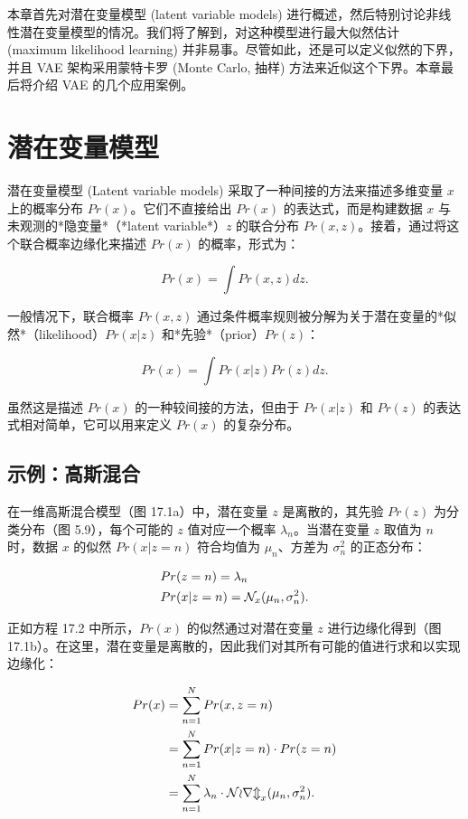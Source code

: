 \documentclass[lang=cn,newtx,10pt,scheme=chinese]{elegantbook}
\begin{document}
本章首先对潜在变量模型 (latent variable models) 进行概述，然后特别讨论非线性潜在变量模型的情况。我们将了解到，对这种模型进行最大似然估计 (maximum likelihood learning) 并非易事。尽管如此，还是可以定义似然的下界，并且 VAE 架构采用蒙特卡罗 (Monte Carlo, 抽样) 方法来近似这个下界。本章最后将介绍 VAE 的几个应用案例。
\section{潜在变量模型}

潜在变量模型 (Latent variable models) 采取了一种间接的方法来描述多维变量 \(x\) 上的概率分布 \(Pr(x)\)。它们不直接给出 \(Pr(x)\) 的表达式，而是构建数据 \(x\) 与未观测的*隐变量*（*latent variable*）\(z\) 的联合分布 \(Pr(x, z)\)。接着，通过将这个联合概率边缘化来描述 \(Pr(x)\) 的概率，形式为：

\begin{equation}
Pr(x) = \int Pr(x, z)dz. 
\end{equation}

一般情况下，联合概率 \(Pr(x, z)\) 通过条件概率规则被分解为关于潜在变量的*似然*（likelihood）\(Pr(x|z)\) 和*先验*（prior）\(Pr(z)\)：

\begin{equation}
Pr(x) = \int Pr(x|z)Pr(z)dz. 
\end{equation}

虽然这是描述 \(Pr(x)\) 的一种较间接的方法，但由于 \(Pr(x|z)\) 和 \(Pr(z)\) 的表达式相对简单，它可以用来定义 \(Pr(x)\) 的复杂分布。

\subsection{示例：高斯混合}

在一维高斯混合模型（图 17.1a）中，潜在变量 \(z\) 是离散的，其先验 \(Pr(z)\) 为分类分布（图 5.9），每个可能的 \(z\) 值对应一个概率 \(\lambda_n\)。当潜在变量 \(z\) 取值为 \(n\) 时，数据 \(x\) 的似然 \(Pr(x|z = n)\) 符合均值为 \(\mu_n\)、方差为 \(\sigma^2_n\) 的正态分布：


\begin{align}
&Pr(z = n) = \lambda_n \notag \\
&Pr(x|z = n) = \mathcal{N}_{x}(\mu_n, \sigma^2_n). 
\end{align} 


正如方程 17.2 中所示，\(Pr(x)\) 的似然通过对潜在变量 \(z\) 进行边缘化得到（图 17.1b）。在这里，潜在变量是离散的，因此我们对其所有可能的值进行求和以实现边缘化：


\begin{align}
Pr(x) &= \sum_{n=1}^{N} Pr(x, z = n) \notag \\
&= \sum_{n=1}^{N} Pr(x|z = n) \cdot Pr(z = n) \notag \\
&= \sum_{n=1}^{N} \lambda_n \cdot \mathcal{Norm}_x(\mu_n, \sigma^2_n). 
\end{align} 
\end{document}
